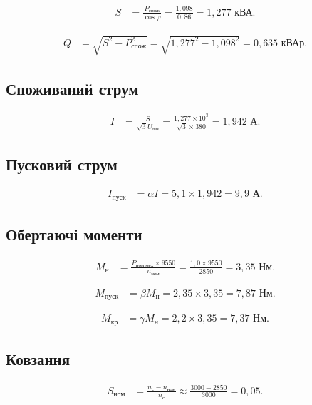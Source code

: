 \documentclass[a4paper]{article}
\begin{document}
\begin{align*}
    S &= \frac{P_{\text{спож}}}{\cos\varphi} = \frac{1,098}{0,86} = 1,277 \text{ кВА}.
\end{align*}

\begin{align*}
    Q &= \sqrt{S^2 - P_{\text{спож}}^2} = \sqrt{1,277^2 - 1,098^2} = 0,635 \text{ кВАр}.
\end{align*}

\subsection*{Споживаний струм}

\begin{align*}
    I &= \frac{S}{\sqrt{3} U_{\text{лін}}} = \frac{1,277 \times 10^3}{\sqrt{3} \times 380} = 1,942 \text{ А}.
\end{align*}

\subsection*{Пусковий струм}

\begin{align*}
    I_{\text{пуск}} &= \alpha I = 5,1 \times 1,942 = 9,9 \text{ А}.
\end{align*}

\subsection*{Обертаючі моменти}

\begin{align*}
    M_{\text{н}} &= \frac{P_{\text{ном.мех}} \times 9550}{n_{\text{ном}}} = \frac{1,0 \times 9550}{2850} = 3,35 \text{ Нм}.
\end{align*}

\begin{align*}
    M_{\text{пуск}} &= \beta M_{\text{н}} = 2,35 \times 3,35 = 7,87 \text{ Нм}.
\end{align*}

\begin{align*}
    M_{\text{кр}} &= \gamma M_{\text{н}} = 2,2 \times 3,35 = 7,37 \text{ Нм}.
\end{align*}

\subsection*{Ковзання}

\begin{align*}
    S_{\text{ном}} &= \frac{n_{\text{с}} - n_{\text{ном}}}{n_{\text{с}}} \approx \frac{3000 - 2850}{3000} = 0,05.
\end{align*}
\end{document}
